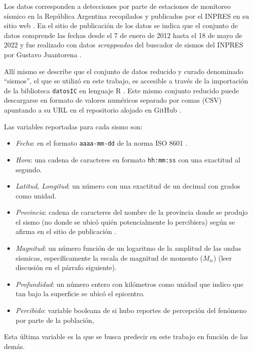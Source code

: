 \documentclass[a4paper]{report}
\begin{document}
Los datos corresponden a detecciones por parte de estaciones de monitoreo sísmico en la República Argentina recopilados y publicados por el INPRES en su sitio web \cite{noauthor_buscador_nodate}.
En el sitio de publicación de los datos se indica que el conjunto de datos comprende las fechas desde el 7 de enero de 2012 hasta el 18 de mayo de 2022 y fue realizado con datos \emph{scrappeados} del buscador de sismos del INPRES por Gustavo Juantorena \cite[sección 4.1]{daniela_parada_ic-datasets-docencia_nodate}. 

Allí mismo se describe que el conjunto de datos reducido y curado denominado ``sismos'', el que se utilizó en este trabajo, es accesible a través de la importación de la biblioteca \texttt{datosIC} en lenguaje R \cite[sección 5.1.1]{daniela_parada_ic-datasets-docencia_nodate}.
Este mismo conjunto reducido puede descargarse en formato de valores numéricos separado por comas (CSV) apuntando a su URL en el repositorio alojado en GitHub \cite{daniela_parada_sismos-arg_nodate}. 

Las variables reportadas para cada sismo son:
\begin{itemize}
	\item \emph{Fecha}: en el formato \verb'aaaa-mm-dd' de la norma ISO 8601 \cite{noauthor_iso_2019}.
	\item \emph{Hora}: una cadena de caracteres en formato \verb'hh:mm:ss' con una exactitud al segundo.
	\item \emph{Latitud, Longitud}: un número con una exactitud de un decimal con grados como unidad.
	\item \emph{Provincia}: cadena de caracteres del nombre de la provincia donde se produjo el sismo (no donde se ubicó quién potencialmente lo percibiera) según se afirma en el sitio de publicación \cite[5.1.1]{daniela_parada_ic-datasets-docencia_nodate}.
	\item \emph{Magnitud}: un número función de un logaritmo de la amplitud de las ondas sísmicas, específicamente la escala de magnitud de momento (\(M_w\)) (leer discusión en el párrafo siguiente).
	\item \emph{Profundidad}: un número entero con kilómetros como unidad que indico que tan bajo la superficie se ubicó el epicentro.
	\item \emph{Percibido}: variable booleana de si hubo reportes de percepción del fenómeno por parte de la población, 
\end{itemize}
Esta última variable es la que se busca predecir en este trabajo en función de las demás. 
\end{document}
